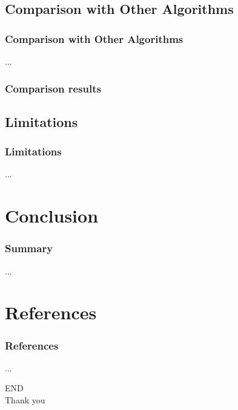 \documentclass[aspectratio=1610]{beamer}
\begin{document}
\subsection{Comparison with Other Algorithms}
\begin{frame}
\frametitle{Comparison with Other Algorithms}
...
\end{frame}
\begin{frame}
\frametitle{Comparison results}
\end{frame}
\subsection{Limitations}
\begin{frame}
\frametitle{Limitations}
...
\end{frame}

\section{Conclusion}
\begin{frame}
\frametitle{Summary}
...
\end{frame}

\section{References}
\begin{frame}
\frametitle{References}
...
\end{frame}
\begin{frame}
  \centering
  \Huge{END\\Thank you}
\end{frame}
\end{document}
